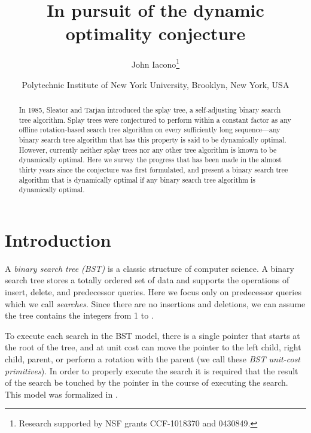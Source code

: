 \documentclass[11pt]{article}
\title{In pursuit of the dynamic optimality conjecture}
\author{
John Iacono\thanks{Research supported by NSF grants CCF-1018370 and 0430849.}
}
\date{
  Polytechnic Institute of New York University, Brooklyn, New York, USA 
  }
\begin{document}
\maketitle

\begin{abstract}
In 1985, Sleator and Tarjan introduced the splay tree, a self-adjusting binary search tree algorithm. Splay trees were conjectured to perform within a constant factor as any offline rotation-based search tree algorithm on every sufficiently long sequence---any binary search tree algorithm that has this property is said to be dynamically optimal. However, currently neither splay trees nor any other tree algorithm is known to be dynamically optimal.  Here we survey the progress that has been made in the almost thirty years since the conjecture was first formulated, and present a binary search tree algorithm that is dynamically optimal if any binary search tree algorithm is dynamically optimal.
\end{abstract}




\newcommand{\OPT}{\mathrm{OPT}}
\newcommand{\IRB}{\mathrm{IRB}}
\newcommand{\ALT}{\mathrm{ALT}}


\section{Introduction}

A \emph{binary search tree (BST)} is a classic structure of computer science. A binary search tree stores a totally ordered set of data and supports the operations of insert, delete, and predecessor queries. Here we focus only on predecessor queries which we call \emph{searches}.
Since there are no insertions and deletions, we can assume the tree contains the integers from 1 to .

To execute each search in the BST model, there is a single pointer that starts at the root of the tree, and at unit cost can move the pointer to the left child, right child, parent, or perform a rotation with the parent (we call these \emph{BST unit-cost primitives}). In order to properly execute the search it is required that the result of the search be touched by the pointer in the course of executing the search. This model was formalized in \cite{DBLP:journals/siamcomp/Wilber89}.
\end{document}

